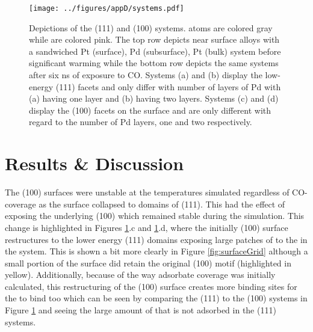 \begin{landscape}
\begin{figure}[p!]
\centering
  \texttt{[image: ../figures/appD/systems.pdf]}
  \caption{Depictions of the (111) and (100) systems.  atoms are colored
gray while  are colored pink. The top row depicts near surface alloys
with a sandwiched Pt (surface), Pd (subsurface), Pt (bulk) system before
significant warming while the bottom row depicts the same systems after six ns of
exposure to CO. Systems (a) and (b) display the low-energy (111) facets and
only differ with number of layers of Pd with (a) having one layer and (b)
having two layers. Systems (c) and (d) display the (100) facets on the surface
and are only different with regard to the number of Pd layers, one and two
respectively.}
\label{fig:biSystems}
\end{figure}
\end{landscape}

\section{Results \& Discussion}
The (100)  surfaces were unstable at the temperatures
simulated regardless of CO-coverage as the surface  collapsed to domains
of (111). This had the effect of exposing the underlying (100)  which
remained stable during the simulation. This change is highlighted in Figures
\ref{fig:biSystems}.c and \ref{fig:biSystems}.d, where the initially (100)
surface restructures to the lower energy (111) domains exposing large patches
of  to the  in the system. This is shown a bit more clearly in
Figure \ref{fig:surfaceGrid} although a small portion of the surface did retain
the original (100) motif (highlighted in yellow). Additionally, because of the
way adsorbate coverage was initially calculated, this restructuring of the
(100) surface creates more binding sites for the  to bind too which can
be seen by comparing the (111) to the (100) systems in Figure
\ref{fig:biSystems} and seeing the large amount of  that is not adsorbed
in the (111) systems.

